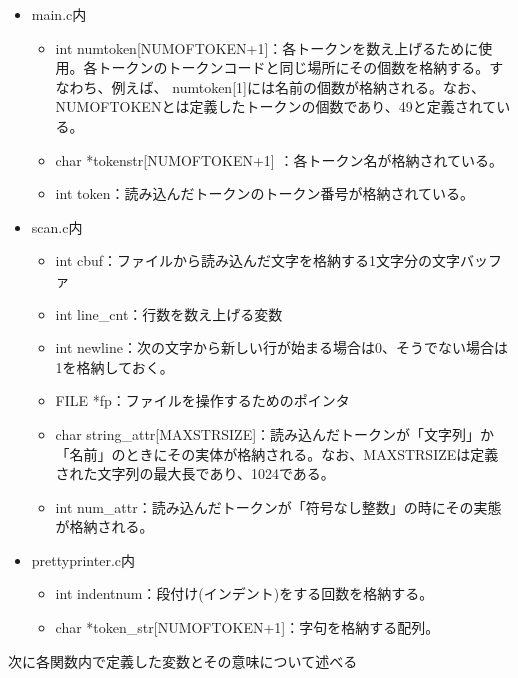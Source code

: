 \documentclass{jarticle}
\begin{document}
\begin{itemize}
  \item main.c内
  \begin{itemize}
    \item int
    numtoken[NUMOFTOKEN+1]：各トークンを数え上げるために使用。各トークンのトークンコードと同じ場所にその個数を格納する。すなわち、例えば、
    numtoken[1]には名前の個数が格納される。なお、NUMOFTOKENとは定義したトークンの個数であり、49と定義されている。
    \item char *tokenstr[NUMOFTOKEN+1] ：各トークン名が格納されている。
    \item int token：読み込んだトークンのトークン番号が格納されている。
  \end{itemize}
  \item scan.c内
  \begin{itemize}
    \item int cbuf：ファイルから読み込んだ文字を格納する1文字分の文字バッファ
    \item int line\_cnt：行数を数え上げる変数
    \item int newline：次の文字から新しい行が始まる場合は0、そうでない場合は1を格納しておく。
    \item FILE *fp：ファイルを操作するためのポインタ
    \item char
    string\_attr[MAXSTRSIZE]：読み込んだトークンが「文字列」か「名前」のときにその実体が格納される。なお、MAXSTRSIZEは定義された文字列の最大長であり、1024である。
    \item int num\_attr：読み込んだトークンが「符号なし整数」の時にその実態が格納される。
  \end{itemize}
  \item prettyprinter.c内
  \begin{itemize}
    \item int indentnum：段付け(インデント)をする回数を格納する。
    \item char *token\_str[NUMOFTOKEN+1]：字句を格納する配列。
  \end{itemize}
\end{itemize}

次に各関数内で定義した変数とその意味について述べる
\end{document}
